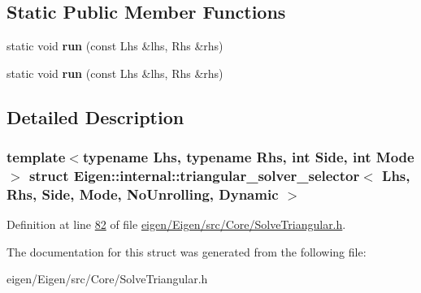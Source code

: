 \subsection*{Static Public Member Functions}
\begin{DoxyCompactItemize}
\item 
\mbox{\label{struct_eigen_1_1internal_1_1triangular__solver__selector_3_01_lhs_00_01_rhs_00_01_side_00_01_mod9d4c365fbf3ecd733e3c477f950cfbe8_aa9bce083f5802ae4fab1e7e3c6e8a224}} 
static void {\bfseries run} (const Lhs \&lhs, Rhs \&rhs)
\item 
\mbox{\label{struct_eigen_1_1internal_1_1triangular__solver__selector_3_01_lhs_00_01_rhs_00_01_side_00_01_mod9d4c365fbf3ecd733e3c477f950cfbe8_aa9bce083f5802ae4fab1e7e3c6e8a224}} 
static void {\bfseries run} (const Lhs \&lhs, Rhs \&rhs)
\end{DoxyCompactItemize}


\subsection{Detailed Description}
\subsubsection*{template$<$typename Lhs, typename Rhs, int Side, int Mode$>$\newline
struct Eigen\+::internal\+::triangular\+\_\+solver\+\_\+selector$<$ Lhs, Rhs, Side, Mode, No\+Unrolling, Dynamic $>$}



Definition at line \hyperlink{eigen_2_eigen_2src_2_core_2_solve_triangular_8h_source_l00082}{82} of file \hyperlink{eigen_2_eigen_2src_2_core_2_solve_triangular_8h_source}{eigen/\+Eigen/src/\+Core/\+Solve\+Triangular.\+h}.



The documentation for this struct was generated from the following file\+:\begin{DoxyCompactItemize}
\item 
eigen/\+Eigen/src/\+Core/\+Solve\+Triangular.\+h\end{DoxyCompactItemize}

